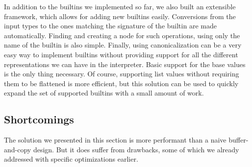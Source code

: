 \documentclass[twoside,11pt,a4paper]{article}
\begin{document}
In addition to the builtins we implemented so far, we also built an extensible framework, which allows for adding new builtins easily. Conversions from the input types to the ones matching the signature of the builtin are made automatically. Finding and creating a node for such operations, using only the name of the builtin is also simple. Finally, using canonicalization can be a very easy way to implement builtins without providing support for all the different representations we can have in the interpreter. Basic support for the base values is the only thing necessary. Of course, supporting list values without requiring them to be flattened is more efficient, but this solution can be used to quickly expand the set of supported builtins with a small amount of work.

\subsection{Shortcomings}



The solution we presented in this section is more performant than a naive buffer-and-copy design. But it does suffer from drawbacks, some of which we already addressed with specific optimizations earlier.
\end{document}
